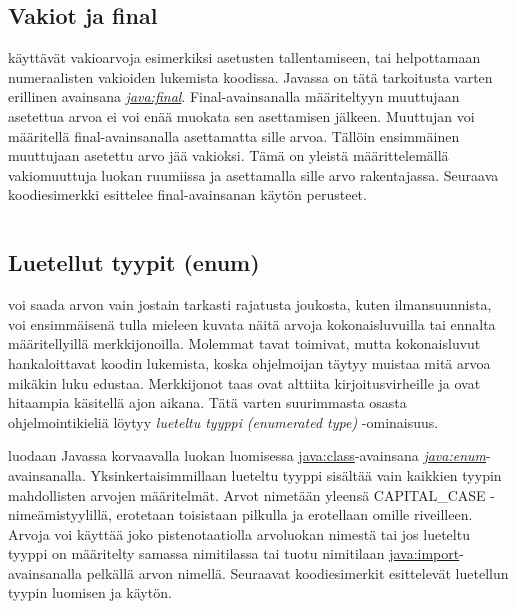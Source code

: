 \documentclass{tufte-book}
\newcommand{\eng}[1]{\textit{(#1)}}
\newcommand{\new}[1]{\textit{\gls{#1}}}
\newcommand{\neweng}[2]{\new{#1} \eng{#2}}
\newcommand{\java}[1]{\underline{\gls{java:#1}}}
\newcommand{\newjava}[1]{\textit{\java{#1}}}
\newcommand{\code}[3]{
\begin{listing}
    \inputminted{java}{OhjelmointiopasEsimerkit/src/#1/#2.java}
    \caption{#3}
    \label{Java-#1-#2}
\end{listing}
}
\begin{document}
\code{week3/basicexamples}{Casting}{Tyyppimuunnos primitiivisestä tietotyypistä toiseen Javassa}

\subsection{Vakiot ja final}
\label{final}

 käyttävät vakioarvoja esimerkiksi asetusten tallentamiseen, tai
helpottamaan numeraalisten vakioiden lukemista koodissa. Javassa on tätä tarkoitusta varten
erillinen avainsana \newjava{final}. Final-avainsanalla määriteltyyn muuttujaan asetettua arvoa ei
voi enää muokata sen asettamisen jälkeen. Muuttujan voi määritellä final-avainsanalla asettamatta
sille arvoa. Tällöin ensimmäinen muuttujaan asetettu arvo jää vakioksi. Tämä on yleistä
määrittelemällä vakiomuuttuja luokan ruumiissa ja asettamalla sille arvo rakentajassa. Seuraava
koodiesimerkki esittelee final-avainsanan käytön perusteet.

\code{week3/basicexamples}{FinalUsage}{\java{final}-avainsanan käyttö Javassa}

\subsection{Luetellut tyypit (enum)}
\label{enum}

 voi saada arvon vain jostain tarkasti rajatusta joukosta, kuten
ilmansuunnista, voi ensimmäisenä tulla mieleen kuvata näitä arvoja kokonaisluvuilla tai ennalta
määritellyillä merkkijonoilla. Molemmat tavat toimivat, mutta kokonaisluvut hankaloittavat koodin
lukemista, koska ohjelmoijan täytyy muistaa mitä arvoa mikäkin luku edustaa. Merkkijonot taas ovat
alttiita kirjoitusvirheille ja ovat hitaampia käsitellä ajon aikana. Tätä varten suurimmasta
osasta ohjelmointikieliä löytyy \neweng{lueteltu tyyppi}{enumerated type} -ominaisuus.

 luodaan Javassa korvaavalla luokan luomisessa \java{class}-avainsana
\newjava{enum}-avainsanalla. Yksinkertaisimmillaan lueteltu tyyppi sisältää vain kaikkien tyypin
mahdollisten arvojen määritelmät. Arvot nimetään yleensä CAPITAL\_CASE -nimeämistyylillä,
erotetaan toisistaan pilkulla ja erotellaan omille riveilleen. Arvoja voi käyttää joko
pistenotaatiolla arvoluokan nimestä tai jos lueteltu tyyppi on määritelty samassa nimitilassa
tai tuotu nimitilaan \java{import}-avainsanalla pelkällä arvon nimellä. Seuraavat koodiesimerkit
esittelevät luetellun tyypin luomisen ja käytön.
\end{document}

